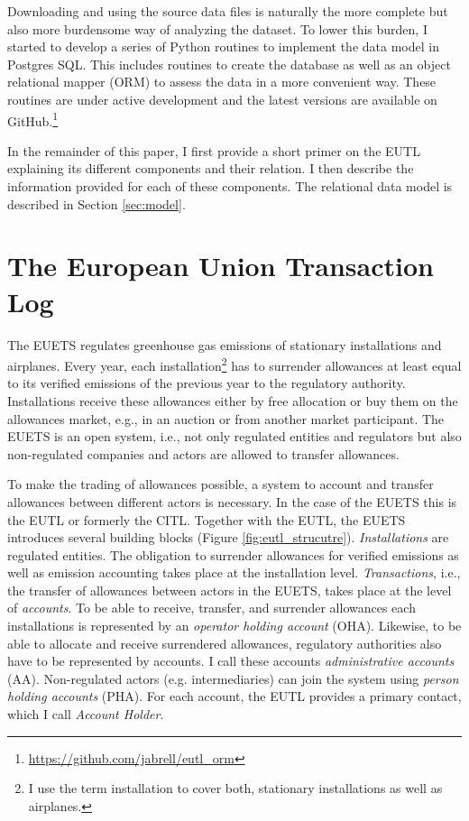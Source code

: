 \documentclass[authoryear]{elsarticle}
\begin{document}
Downloading and using the source data files is naturally the more complete but also more burdensome way of analyzing the dataset. To lower this burden, I started to develop a series of Python routines to implement the data model in Postgres SQL. This includes routines to create the database as well as an object relational mapper (ORM) to assess the data in a more convenient way. These routines are under active development and the latest versions are available on  GitHub.\footnote{\url{https://github.com/jabrell/eutl_orm}}

In the remainder of this paper, I first provide a short primer on the EUTL explaining its different components and their relation. I then describe the information provided for each of these components. The relational data model is described in Section \ref{sec:model}. 


	
\section{The European Union Transaction Log}
The EUETS regulates greenhouse gas emissions of stationary installations and airplanes. Every year, each installation\footnote{I use the term installation to cover both, stationary installations as well as airplanes.} has to surrender allowances at least equal to its verified emissions of the previous year to the regulatory authority. Installations receive these allowances either by free allocation or buy them on the allowances market, e.g., in an auction or from another market participant. The EUETS is an open system, i.e., not only regulated entities and regulators but also non-regulated companies and actors are allowed to transfer allowances. 

To make the trading of allowances possible, a system to account and transfer allowances between different actors is necessary. In the case of the EUETS this is the EUTL or formerly the CITL. Together with the EUTL, the EUETS introduces several building blocks (Figure \ref{fig:eutl_strucutre}). \emph{Installations} are regulated entities. The obligation to surrender allowances for verified emissions as well as emission accounting takes place at the installation level. \textit{Transactions}, i.e., the transfer of allowances between actors in the EUETS, takes place at the level of \textit{accounts}. To be able to receive, transfer, and surrender allowances each installations is represented by an \textit{operator holding account} (OHA). Likewise, to be able to allocate and receive surrendered allowances, regulatory authorities also have to be represented by accounts. I call these accounts \textit{administrative accounts} (AA). Non-regulated actors (e.g. intermediaries) can join the system using \textit{person holding accounts} (PHA). For each account, the EUTL provides a primary contact, which I call \textit{Account Holder}.
\end{document}
